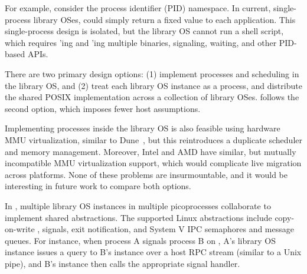 
For example, consider the process identifier (PID) namespace. In current, single-process library OSes,  could simply return a fixed value to each application.
This single-process design is isolated, but the library OS cannot run a shell script, which requires 'ing and 'ing multiple binaries, signaling, waiting, and other PID-based APIs.

\vspace{5pt}
There are two primary design options: (1) implement processes and scheduling in 
the library OS, and (2) treat each library OS instance as a process, and distribute the shared POSIX implementation across a collection of library OSes.
\graphene{} follows the second option, which imposes fewer host assumptions.

Implementing processes
inside the library OS is also feasible using 
hardware MMU virtualization, similar to Dune~\cite{belay12dune},
but this reintroduces a duplicate scheduler and memory management.
Moreover, Intel and AMD have similar, but mutually incompatible MMU virtualization support,
which would complicate live migration across platforms.
None of these problems are insurmountable, and it would be interesting in future
work to compare both options.


In \graphene{}, multiple library OS instances in multiple picoprocesses collaborate to implement shared abstractions. The supported Linux abstractions include copy-on-write , signals, exit notification, and System V IPC semaphores and message queues.
For instance, when process A signals process B on \graphene{}, A's library OS instance issues a query to B's instance over a host RPC stream (similar to a Unix pipe), and B's instance then calls the appropriate signal handler.

